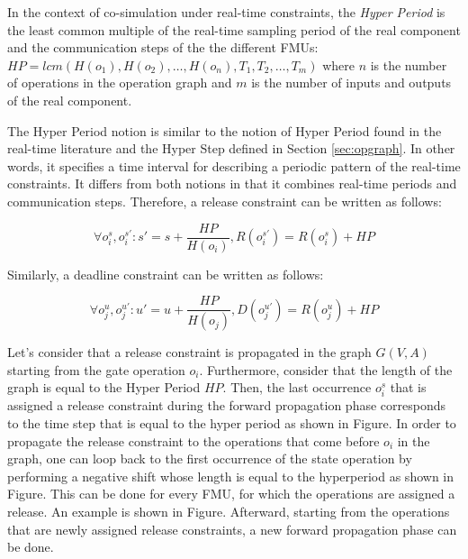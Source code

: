 \begin{definition}
In the context of co-simulation under real-time constraints, the \textit{Hyper Period} is the least common multiple of the real-time sampling period of the real component and the communication steps of the the different FMUs: $HP=lcm(H(o_1),H(o_2), \dots ,\allowbreak H(o_n), T_1, T_2, \dots ,T_m)$ where $n$ is the number of operations in the operation graph and $m$ is the number of inputs and outputs of the real component.
\label{def:hyperperiod}
\end{definition}

The Hyper Period notion is similar to the notion of Hyper Period found in the real-time literature and the Hyper Step defined in Section \ref{sec:opgraph}. In other words, it specifies a time interval for describing a periodic pattern of the real-time constraints. It differs from both notions in that it combines real-time periods and communication steps. Therefore, a release constraint can be written as follows:

\begin{equation}
\forall o_i^s, o_i^{s'}: s' = s + \frac{HP}{H(o_i)}, R(o_i^{s'}) = R(o_i^s) + HP
\label{eq:release}
\end{equation}

Similarly, a deadline constraint can be written as follows:

\begin{equation}
\forall o_j^u, o_j^{u'}: u' = u + \frac{HP}{H(o_j)}, D(o_j^{u'}) = R(o_j^u) + HP
\label{eq:release}
\end{equation}

Let's consider that a release constraint is propagated in the graph $G(V,A)$ starting from the gate operation $o_i$.  Furthermore, consider that the length of the graph is equal to the Hyper Period $HP$. Then, the last occurrence $o_i^s$ that is assigned a release constraint during the forward propagation phase corresponds to the time step that is equal to the hyper period as shown in Figure. In order to propagate the release constraint to the operations that come before $o_i$ in the graph, one can loop back to the first occurrence of the state operation by performing a negative shift whose length is equal to the hyperperiod as shown in Figure. This can be done for every FMU, for which the operations are assigned a release. An example is shown in Figure. Afterward, starting from the operations that are newly assigned release constraints, a new forward propagation phase can be done.

